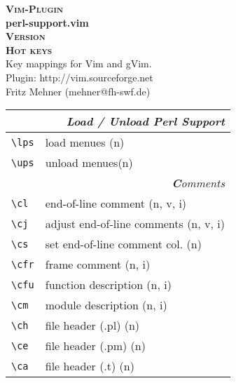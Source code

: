 \documentclass[oneside,11pt,a4paper,DIV23]{scrartcl}
\begin{document}
\begin{center}
%
\textbf{\textsc{\small{Vim-Plugin}}}\\
\textbf{\large{perl-support.vim}}\\
\textbf{\textsc{\small{Version \Pluginversion}}}\\
\vspace{5mm}%
\textbf{\textsc{\huge{Hot keys}}}\\ 
\vspace{5mm}%
\footnotesize{Key mappings for Vim and gVim.}\\
\footnotesize{Plugin: http://vim.sourceforge.net}\\
\footnotesize{Fritz Mehner (mehner@fh-swf.de)}\\
\vspace{10.5mm}
\small
\begin{tabular}[]{|p{12mm}|p{58mm}|}
\hline
\multicolumn{2}{|r|}{\textsl{\textbf{L}oad / \textbf{U}nload Perl Support}} \\
\hline \verb'\lps'  & load menues  \hfill (n) \\
\hline \verb'\ups'  & unload menues\hfill (n) \\
\hline
\hline
\multicolumn{2}{|r|}{\textsl{\textbf{C}omments}} \\
\hline \verb'\cl'  & end-of-line comment               \hfill (n, v, i)\\
\hline \verb'\cj'  & adjust end-of-line comments       \hfill (n, v, i)\\
\hline \verb'\cs'  & set end-of-line comment col.      \hfill (n)    \\
\hline \verb'\cfr' & frame comment                     \hfill (n, i)  \\
\hline \verb'\cfu' & function description              \hfill (n, i)  \\
\hline \verb'\cm'  & module description                \hfill (n, i)  \\
\hline \verb'\ch'  & file header (.pl)                 \hfill (n)    \\
\hline \verb'\ce'  & file header (.pm)                 \hfill (n)    \\
\hline \verb'\ca'  & file header (.t)                  \hfill (n)    \\

\end{tabular}
\end{center}
\end{document}
